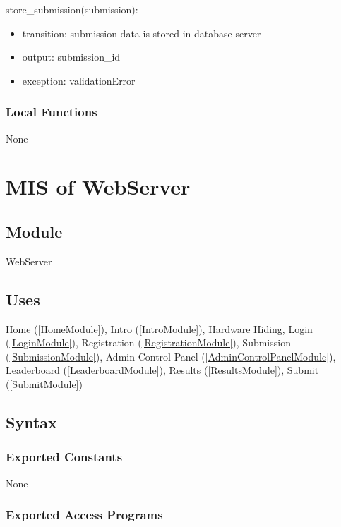 \documentclass[12pt, titlepage]{article}
\begin{document}
\noindent store\_submission(submission):
\begin{itemize}
\item transition: submission data is stored in database server
\item output: submission\_id
\item exception: validationError
\end{itemize}

\subsubsection{Local Functions}

None

\newpage

\section{MIS of WebServer} \label{WebServerModule}

\subsection{Module}

WebServer

\subsection{Uses}

Home (\ref{HomeModule}), Intro (\ref{IntroModule}), Hardware Hiding, Login (\ref{LoginModule}), Registration (\ref{RegistrationModule}), Submission (\ref{SubmissionModule}), Admin Control Panel (\ref{AdminControlPanelModule}), Leaderboard (\ref{LeaderboardModule}), Results (\ref{ResultsModule}), Submit (\ref{SubmitModule})

\subsection{Syntax}

\subsubsection{Exported Constants}

None

\subsubsection{Exported Access Programs}
\end{document}
